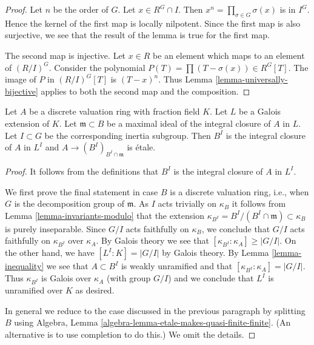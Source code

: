 \begin{proof}
Let $n$ be the order of $G$. Let $x \in R^G \cap I$. Then
$x^n = \prod_{\sigma \in G} \sigma(x)$ is in $I^G$. Hence the kernel
of the first map is locally nilpotent. Since the first map is also
surjective, we see that the result of the lemma is true for the first map.

\medskip\noindent
The second map is injective. Let $x \in R$ be an element which maps to
an element of $(R/I)^G$. Consider the polynomial
$P(T) = \prod (T - \sigma(x)) \in R^G[T]$. The image of $P$ in $(R/I)^G[T]$
is $(T - x)^n$. Thus Lemma \ref{lemma-universally-bijective}
applies to both the second map and the composition.
\end{proof}

\begin{lemma}
\label{lemma-inertial-invariants-unramified}
Let $A$ be a discrete valuation ring with fraction field $K$.
Let $L$ be a Galois extension of $K$. Let $\mathfrak m \subset B$
be a maximal ideal of the integral closure of $A$ in $L$.
Let $I \subset G$ be the corresponding inertia subgroup.
Then $B^I$ is the integral closure of $A$ in $L^I$ and
$A \to (B^I)_{B^I \cap \mathfrak m}$ is \'etale.
\end{lemma}

\begin{proof}
It follows from the definitions that $B^I$ is the integral closure
of $A$ in $L^I$.

\medskip\noindent
We first prove the final statement in case $B$ is a discrete valuation
ring, i.e., when $G$ is the decomposition group of $\mathfrak m$.
As $I$ acts trivially on $\kappa_B$ it follows from
Lemma \ref{lemma-invariants-modulo} that the extension
$\kappa_{B^I} = B^I/(B^I \cap \mathfrak m) \subset \kappa_B$
is purely inseparable. Since $G/I$ acts faithfully on $\kappa_B$,
we conclude that $G/I$ acts faithfully on $\kappa_{B^I}$ over $\kappa_A$.
By Galois theory we see that $[\kappa_{B^I} : \kappa_A] \geq |G/I|$.
On the other hand, we have $[L^I : K] = |G/I|$ by Galois theory. By
Lemma \ref{lemma-inequality}
we see that $A \subset B^I$ is weakly unramified and that
$[\kappa_{B^I} : \kappa_A] = |G/I|$. Thus $\kappa_{B^I}$ is Galois
over $\kappa_A$ (with group $G/I$) and we conclude that $L^I$ is
unramified over $K$ as desired.

\medskip\noindent
In general we reduce to the case discussed in the previous paragraph
by splitting $B$ using
Algebra, Lemma \ref{algebra-lemma-etale-makes-quasi-finite-finite}.
(An alternative is to use completion to do this.)
We omit the details.
\end{proof}

